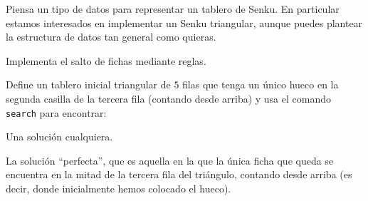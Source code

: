 \begin{listaejercicios}

\item


Piensa un tipo de datos para representar un tablero de Senku. En particular
estamos interesados en implementar un Senku triangular, aunque puedes plantear la
estructura de datos tan general como quieras.

\item
Implementa el salto de fichas mediante reglas.

\item
Define un tablero inicial triangular de $5$ filas que tenga un \'unico hueco en la
segunda casilla de la tercera fila (contando desde arriba) y usa el comando \verb"search"
para encontrar:
\begin{listaalph}
\item
Una soluci\'on cualquiera.

\item
La soluci\'on ``perfecta'', que es aquella en la que la \'unica ficha que queda se encuentra
en la mitad de la tercera fila del tri\'angulo, contando desde arriba (es decir, donde
inicialmente hemos colocado el hueco).
\end{listaalph}

%

%

\end{listaejercicios}


